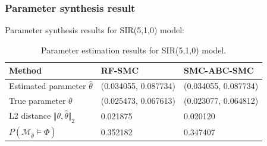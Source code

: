 \subsubsection{Parameter synthesis result}
\noindent Parameter synthesis results for SIR(5,1,0) model:
\begin{table}[H]
    \begin{tabular}{|l|l|l|}
        \hline
        Method                                           & RF-SMC               & SMC-ABC-SMC          \\ \hline
        Estimated parameter $\hat{\theta}$               & (0.034055, 0.087734) & (0.034055, 0.087734) \\ \hline
        True parameter $\theta$                          & (0.025473, 0.067613) & (0.023077, 0.064812) \\ \hline
        L2 distance $\Vert \theta, \hat{\theta} \Vert_2$ & 0.021875             & 0.020120             \\ \hline
        $P(\mathcal{M}_{\hat{\theta}}\models\Phi)$       & 0.352182             & 0.347407             \\ \hline
    \end{tabular}
    \caption{Parameter estimation results for SIR(5,1,0) model.}
\end{table}


